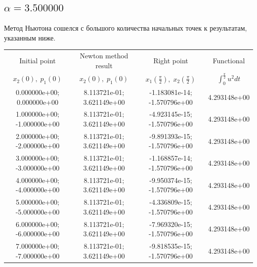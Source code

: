 \documentclass[titlepage]{article}
\def\l{\left}
\def\r{\right}
\begin{document}
\subsection{$\alpha = 3.500000$} 
Метод Ньютона сошелся с большого количества начальных точек к результатам, указанным ниже. \\ 
\begin{tabular}{ | c | c | c | c |} 
\hline 
Initial point  & Newton method result & Right point & Functional 
 \\ $x_2(0), \; p_1(0)$ & $x_2(0), \; p_1(0)$ & $x_1\l(\frac{\pi}{2}\r), \; x_2\l(\frac{\pi}{2}\r)$ & $\int_{0}^{\frac{\pi}{2}}u^2dt$  \\ \hline 
0.000000e+00; 0.000000e+00 & 8.113721e-01; 3.621149e+00 & -1.183081e-14; -1.570796e+00 & 4.293148e+00 \\ \hline 
1.000000e+00; -1.000000e+00 & 8.113721e-01; 3.621149e+00 & -4.923145e-15; -1.570796e+00 & 4.293148e+00 \\ \hline 
2.000000e+00; -2.000000e+00 & 8.113721e-01; 3.621149e+00 & -9.891393e-15; -1.570796e+00 & 4.293148e+00 \\ \hline 
3.000000e+00; -3.000000e+00 & 8.113721e-01; 3.621149e+00 & -1.168857e-14; -1.570796e+00 & 4.293148e+00 \\ \hline 
4.000000e+00; -4.000000e+00 & 8.113721e-01; 3.621149e+00 & -9.950374e-15; -1.570796e+00 & 4.293148e+00 \\ \hline 
5.000000e+00; -5.000000e+00 & 8.113721e-01; 3.621149e+00 & -4.336809e-15; -1.570796e+00 & 4.293148e+00 \\ \hline 
6.000000e+00; -6.000000e+00 & 8.113721e-01; 3.621149e+00 & -7.969320e-15; -1.570796e+00 & 4.293148e+00 \\ \hline 
7.000000e+00; -7.000000e+00 & 8.113721e-01; 3.621149e+00 & -9.818535e-15; -1.570796e+00 & 4.293148e+00 \\ \hline 
\end{tabular} 
\end{document}
